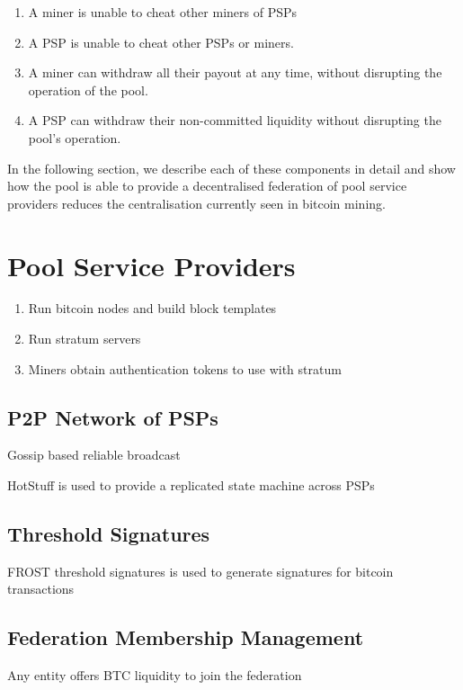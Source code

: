 \documentclass{article}
\begin{document}
\begin{enumerate}
  \item A miner is unable to cheat other miners of PSPs
  \item A PSP is unable to cheat other PSPs or miners.
  \item A miner can withdraw all their payout at any time, without
    disrupting the operation of the pool.
  \item A PSP can withdraw their non-committed liquidity without
    disrupting the pool's operation.
\end{enumerate}

In the following section, we describe each of these components in
detail and show how the pool is able to provide a decentralised
federation of pool service providers reduces the centralisation
currently seen in bitcoin mining.


\section{Pool Service Providers}

\begin{enumerate}
  \item Run bitcoin nodes and build block templates
  \item Run stratum servers
  \item Miners obtain authentication tokens to use with stratum
\end{enumerate}

\subsection{P2P Network of PSPs}

Gossip based reliable broadcast

HotStuff is used to provide a replicated state machine across PSPs

\subsection{Threshold Signatures}

FROST threshold signatures is used to generate signatures for bitcoin
transactions

\subsection{Federation Membership Management}


Any entity offers BTC liquidity to join the federation
\end{document}
